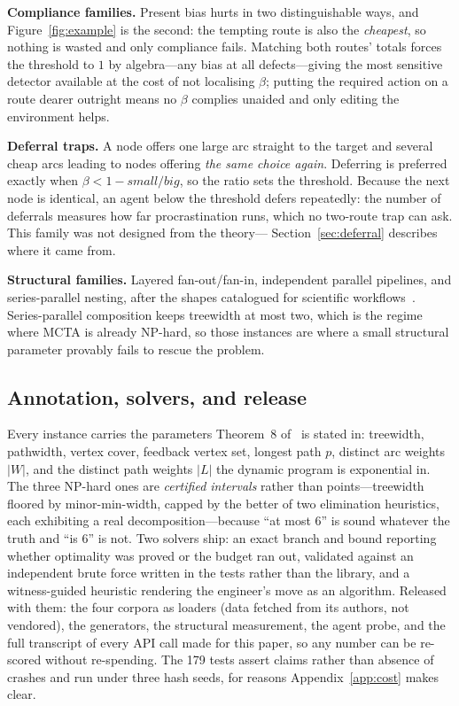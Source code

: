 \documentclass{article}
\begin{document}
\textbf{Compliance families.} Present bias hurts in two distinguishable ways, and
Figure~\ref{fig:example} is the second: the tempting route is also the
\emph{cheapest}, so nothing is wasted and only compliance fails. Matching both
routes' totals forces the threshold to $1$ by algebra---any bias at all
defects---giving the most sensitive detector available at the cost of not localising
$\beta$; putting the required action on a route dearer outright means no $\beta$
complies unaided and only editing the environment helps.

\textbf{Deferral traps.} A node offers one large arc straight to the target and
several cheap arcs leading to nodes offering \emph{the same choice again}. Deferring
is preferred exactly when $\beta < 1 - \textit{small}/\textit{big}$, so the ratio
sets the threshold. Because the next node is identical, an agent below the threshold
defers repeatedly: the number of deferrals measures how far procrastination runs,
which no two-route trap can ask. This family was not designed from the theory---
Section~\ref{sec:deferral} describes where it came from.

\textbf{Structural families.} Layered fan-out/fan-in, independent parallel
pipelines, and series-parallel nesting, after the shapes catalogued for scientific
workflows~\cite{bharathi}. Series-parallel composition keeps treewidth at most two,
which is the regime where MCTA is already NP-hard, so those instances are where a
small structural parameter provably fails to rescue the problem.

\subsection{Annotation, solvers, and release}

Every instance carries the parameters Theorem~8 of~\cite{belova2026} is stated in:
treewidth, pathwidth, vertex cover, feedback vertex set, longest path $p$, distinct
arc weights $|W|$, and the distinct path weights $|L|$ the dynamic program is
exponential in. The three NP-hard ones are \emph{certified intervals} rather than
points---treewidth floored by minor-min-width, capped by the better of two
elimination heuristics, each exhibiting a real decomposition---because ``at most 6''
is sound whatever the truth and ``is 6'' is not. Two solvers ship: an exact branch
and bound reporting whether optimality was proved or the budget ran out, validated
against an independent brute force written in the tests rather than the library, and
a witness-guided heuristic rendering the engineer's move as an algorithm. Released
with them: the four corpora as loaders (data fetched from its authors, not vendored),
the generators, the structural measurement, the agent probe, and the full transcript
of every API call made for this paper, so any number can be re-scored without
re-spending. The 179 tests assert claims rather than absence of crashes and run under
three hash seeds, for reasons Appendix~\ref{app:cost} makes clear.
\end{document}
